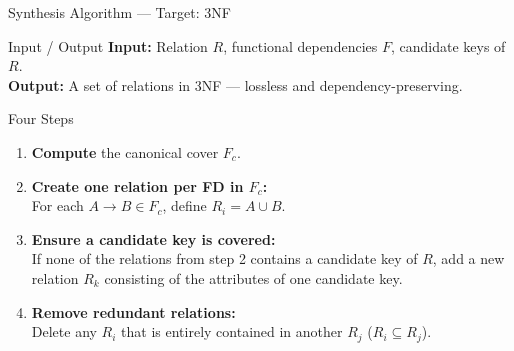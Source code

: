 \begin{frame}{Synthesis Algorithm --- Target: 3NF}
  \begin{block}{Input / Output}
    \textbf{Input:} Relation $R$, functional dependencies $F$, candidate keys
    of $R$.\\
    \textbf{Output:} A set of relations in 3NF --- lossless and dependency-preserving.
  \end{block}

  \begin{block}{Four Steps}
    \begin{enumerate}
      \item \textbf{Compute} the canonical cover $F_c$.
      \item \textbf{Create one relation per FD in $F_c$:}\\
            For each $A \to B \in F_c$, define $R_i = A \cup B$.
      \item \textbf{Ensure a candidate key is covered:}\\
            If none of the relations from step 2 contains a candidate key of
            $R$, add a new relation $R_k$ consisting of the attributes of one
            candidate key.
      \item \textbf{Remove redundant relations:}\\
            Delete any $R_i$ that is entirely contained in another $R_j$
            ($R_i \subseteq R_j$).
    \end{enumerate}
  \end{block}
\end{frame}

